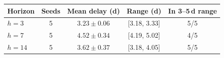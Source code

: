 \begin{tabular}{lcccc}
\hline
Horizon & Seeds & Mean delay (d) & Range (d) & In 3--5\,d range \\
\hline
$h=3$ & 5 & $3.23 \pm 0.06$ & [3.18, 3.33] & 5/5 \\
$h=7$ & 5 & $4.52 \pm 0.34$ & [4.19, 5.02] & 4/5 \\
$h=14$ & 5 & $3.62 \pm 0.37$ & [3.18, 4.05] & 5/5 \\
\hline
\end{tabular}
